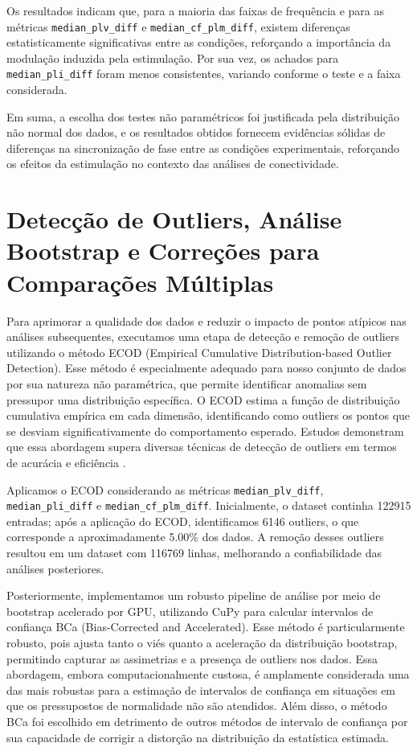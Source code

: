 Os resultados indicam que, para a maioria das faixas de frequência e para as métricas \texorpdfstring{\texttt{median\_plv\_diff}}{median_plv_diff} e \texorpdfstring{\texttt{median\_cf\_plm\_diff}}{median_cf_plm_diff}, existem diferenças estatisticamente significativas entre as condições, reforçando a importância da modulação induzida pela estimulação. Por sua vez, os achados para \texorpdfstring{\texttt{median\_pli\_diff}}{median_pli_diff} foram menos consistentes, variando conforme o teste e a faixa considerada.

Em suma, a escolha dos testes não paramétricos foi justificada pela distribuição não normal dos dados, e os resultados obtidos fornecem evidências sólidas de diferenças na sincronização de fase entre as condições experimentais, reforçando os efeitos da estimulação no contexto das análises de conectividade.

\section{Detecção de Outliers, Análise Bootstrap e Correções para Comparações Múltiplas}

Para aprimorar a qualidade dos dados e reduzir o impacto de pontos atípicos nas análises subsequentes, executamos uma etapa de detecção e remoção de outliers utilizando o método ECOD (Empirical Cumulative Distribution-based Outlier Detection). Esse método é especialmente adequado para nosso conjunto de dados por sua natureza não paramétrica, que permite identificar anomalias sem pressupor uma distribuição específica. O ECOD estima a função de distribuição cumulativa empírica em cada dimensão, identificando como outliers os pontos que se desviam significativamente do comportamento esperado. Estudos demonstram que essa abordagem supera diversas técnicas de detecção de outliers em termos de acurácia e eficiência \cite{li2022}.

Aplicamos o ECOD considerando as métricas \texorpdfstring{\texttt{median\_plv\_diff}}{median_plv_diff}, \texorpdfstring{\texttt{median\_pli\_diff}}{median_pli_diff} e \texorpdfstring{\texttt{median\_cf\_plm\_diff}}{median_cf_plm_diff}. Inicialmente, o dataset continha 122915 entradas; após a aplicação do ECOD, identificamos 6146 outliers, o que corresponde a aproximadamente 5.00\% dos dados. A remoção desses outliers resultou em um dataset com 116769 linhas, melhorando a confiabilidade das análises posteriores.

Posteriormente, implementamos um robusto pipeline de análise por meio de bootstrap acelerado por GPU, utilizando CuPy para calcular intervalos de confiança BCa (Bias-Corrected and Accelerated). Esse método é particularmente robusto, pois ajusta tanto o viés quanto a aceleração da distribuição bootstrap, permitindo capturar as assimetrias e a presença de outliers nos dados. Essa abordagem, embora computacionalmente custosa, é amplamente considerada uma das mais robustas para a estimação de intervalos de confiança em situações em que os pressupostos de normalidade não são atendidos. Além disso, o método BCa foi escolhido em detrimento de outros métodos de intervalo de confiança por sua capacidade de corrigir a distorção na distribuição da estatística estimada.

